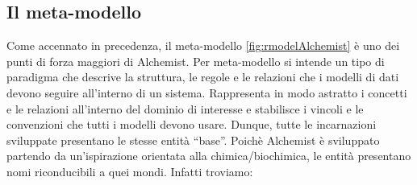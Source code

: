 \subsection{Il meta-modello} 
Come accennato in precedenza, il meta-modello \cref{fig:rmodelAlchemist} è uno dei punti di forza maggiori di Alchemist. 
Per meta-modello si intende un tipo di paradigma che descrive la struttura, le regole e le relazioni
che i modelli di dati devono seguire all'interno di un sistema. Rappresenta in modo astratto i 
concetti e le relazioni all'interno del dominio di interesse e stabilisce i vincoli e le convenzioni
che tutti i modelli devono usare. Dunque, tutte le incarnazioni sviluppate presentano le stesse entità
``base''. Poichè Alchemist è sviluppato partendo da un'ispirazione orientata alla chimica/biochimica,
le entità presentano nomi riconducibili a quei mondi. Infatti troviamo:
